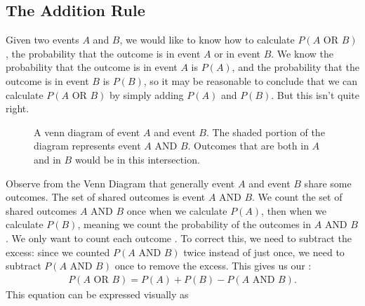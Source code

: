 \documentclass[letterpaper,10pt,english]{jupyterBook}
\begin{document}
\subsection{The Addition Rule}
\label{\detokenize{Ch3 Probability/3.4 Addition Rules and Mutually Exclusive Events:the-addition-rule}}
\sphinxAtStartPar
Given two events \(A\) and \(B\), we would like to know how to calculate \(P(A\text{ OR }B)\), the probability that the outcome is in event \(A\) or in event \(B\). We know the probability that the outcome is in event \(A\) is \(P(A)\), and the probability that the outcome is in event \(B\) is \(P(B)\), so it may be reasonable to conclude that we can calculate \(P(A\text{ OR }B)\) by simply adding \(P(A)\) and \(P(B)\). But this isn’t quite right.

\begin{figure}[htbp]
\centering
\capstart

\noindent{}
\caption{A venn diagram of event \(A\) and event \(B\). The shaded portion of the diagram represents event \(A \text{ AND } B\). Outcomes that are both in \(A\) and in \(B\) would be in this intersection.}\label{\detokenize{Ch3 Probability/3.4 Addition Rules and Mutually Exclusive Events:vennand2}}\end{figure}

\sphinxAtStartPar
Observe from the Venn Diagram that generally event \(A\) and event \(B\) share some outcomes. The set of shared outcomes is event \(A\text{ AND }B\). We count the set of shared outcomes \(A\text{ AND }B\) once when we calculate \(P(A)\), then  when we calculate \(P(B)\), meaning we count the probability of the outcomes in \(A\text{ AND }B\) . We only want to count each outcome . To correct this, we need to subtract the excess: since we counted \(P(A\text{ AND }B)\) twice instead of just once, we need to subtract \(P(A\text{ AND }B)\) once to remove the excess. This gives us our :
\begin{equation*}
\begin{split} P(A\text{ OR } B) = P(A) + P(B) - P(A\text{ AND }B). \end{split}
\end{equation*}
\sphinxAtStartPar
This equation can be expressed visually as
\end{document}
